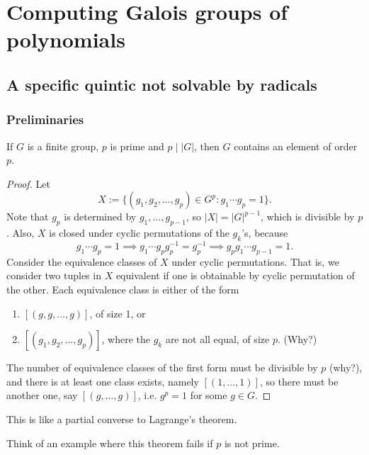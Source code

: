 \chapter{Computing Galois groups of polynomials}

\section{A specific quintic not solvable by radicals}

\subsection{Preliminaries}

\begin{theorem}[Cauchy]
    If $G$ is a finite group, $p$ is prime and $p \mid |G|$, then $G$ contains an element of order $p$.
\end{theorem}

\begin{proof}
    Let
    \[
        X := \{(g_1, g_2, \ldots, g_p) \in G^p: g_1 \cdots g_p = 1\}.
    \]
    Note that $g_p$ is determined by $g_1, \ldots, g_{p - 1}$, so $|X| = |G|^{p - 1}$, which is divisible by $p$. Also, $X$ is closed under cyclic permutations of the $g_k$'s, because
    \[
        g_1 \cdots g_p = 1 \implies g_1 \cdots g_p g_p^{-1} = g_p^{-1} \implies g_p g_1 \cdots g_{p - 1} = 1.
    \]
    Consider the equivalence classes of $X$ under cyclic permutations. That is, we consider two tuples in $X$ equivalent if one is obtainable by cyclic permutation of the other. Each equivalence class is either of the form
    \begin{enumerate}
        \item $[(g, g, \ldots, g)]$, of size 1, or
        \item $[(g_1, g_2, \ldots, g_p)]$, where the $g_k$ are not all equal, of size $p$. (Why?)
    \end{enumerate}
    The number of equivalence classes of the first form must be divisible by $p$ (why?), and there is at least one class exists, namely $[(1, \ldots, 1)]$, so there must be another one, say $[(g, \ldots, g)]$, i.e. $g^p = 1$ for some $g \in G$.
\end{proof}

\begin{remark}
    This is like a partial converse to Lagrange's theorem.
\end{remark}

\begin{exercise}
    Think of an example where this theorem fails if $p$ is not prime.
\end{exercise}

